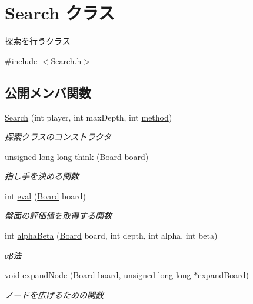 \hypertarget{class_search}{}\section{Search クラス}
\label{class_search}


探索を行うクラス  




{\ttfamily \#include $<$Search.\+h$>$}

\subsection*{公開メンバ関数}
\begin{DoxyCompactItemize}
\item 
\mbox{\hyperlink{class_search_af667d7239ce5bcc07130a14f2aa60e21}{Search}} (int player, int max\+Depth, int \mbox{\hyperlink{class_search_a054d85756a7f57fe3e36ced2f91fd059}{method}})
\begin{DoxyCompactList}\small\item\em 探索クラスのコンストラクタ \end{DoxyCompactList}\item 
unsigned long long \mbox{\hyperlink{class_search_a4b87f03138aff1c1b0ec6bb53dccee91}{think}} (\mbox{\hyperlink{class_board}{Board}} board)
\begin{DoxyCompactList}\small\item\em 指し手を決める関数 \end{DoxyCompactList}\item 
int \mbox{\hyperlink{class_search_a702b78105ebe828a962e9b27e57deb38}{eval}} (\mbox{\hyperlink{class_board}{Board}} board)
\begin{DoxyCompactList}\small\item\em 盤面の評価値を取得する関数 \end{DoxyCompactList}\item 
int \mbox{\hyperlink{class_search_a268903aa97a3e1ad47e404b8ed7140ac}{alpha\+Beta}} (\mbox{\hyperlink{class_board}{Board}} board, int depth, int alpha, int beta)
\begin{DoxyCompactList}\small\item\em αβ法 \end{DoxyCompactList}\item 
void \mbox{\hyperlink{class_search_ae52e3dab738eab0b77d2860eddeb2a88}{expand\+Node}} (\mbox{\hyperlink{class_board}{Board}} board, unsigned long long $\ast$expand\+Board)
\begin{DoxyCompactList}\small\item\em ノードを広げるための関数 \end{DoxyCompactList}\end{DoxyCompactItemize}
